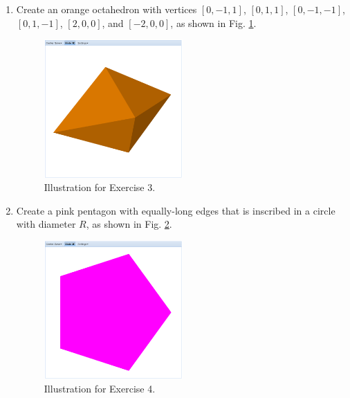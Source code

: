 \documentclass{article}
\begin{document}
\begin{enumerate}
\item Create an orange octahedron with vertices 
$[0, -1, 1]$, $[0, 1, 1]$, $[0, -1, -1]$, $[0, 1, -1]$, $[2, 0, 0]$, and $[-2, 0, 0]$, 
as shown in Fig. \ref{fig:a3}.

\begin{figure}[!ht]
\begin{center}
\includegraphics[width=0.5\textwidth]{img/a3-orange-octahedron.png}
\end{center}
\vspace{-2mm}
\caption{Illustration for Exercise 3.}
\label{fig:a3}
\end{figure}

\item Create a pink pentagon with equally-long edges that is inscribed 
in a circle with diameter $R$, as shown in Fig. \ref{fig:a4}.

\begin{figure}[!ht]
\begin{center}
\includegraphics[width=0.5\textwidth]{img/a4-pink-pentagon.png}
\end{center}
\vspace{-4mm}
\caption{Illustration for Exercise 4.}
\label{fig:a4}
\end{figure}
\newpage


\end{enumerate}
\end{document}
